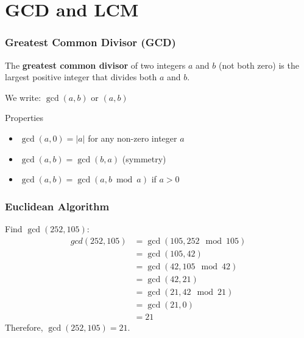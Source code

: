 \documentclass[10pt]{beamer}
\begin{document}
\section{GCD and LCM}

\begin{frame}
    \frametitle{Greatest Common Divisor (GCD)}
    \begin{definition}
        The \textbf{greatest common divisor} of two integers $a$ and $b$ (not both zero) is the largest positive integer that divides both $a$ and $b$.

        We write: $\gcd(a,b)$ or $(a,b)$
    \end{definition}

    \vspace{0.5cm}

    \begin{block}{Properties}
        \begin{itemize}
            \item $\gcd(a,0) = |a|$ for any non-zero integer $a$
            \item $\gcd(a,b) = \gcd(b,a)$ (symmetry)
            \item $\gcd(a,b) = \gcd(a, b \bmod a)$ if $a > 0$
        \end{itemize}
    \end{block}
\end{frame}

\begin{frame}
    \frametitle{Euclidean Algorithm}

    \begin{example}
        Find $\gcd(252, 105)$:
        \begin{align}
            gcd(252, 105) & = \gcd(105, 252 \mod 105) \\
                          & = \gcd(105, 42)           \\
                          & = \gcd(42, 105 \mod 42)   \\
                          & = \gcd(42, 21)            \\
                          & = \gcd(21, 42 \mod 21)    \\
                          & = \gcd(21, 0)             \\
                          & = 21
        \end{align}
        Therefore, $\gcd(252,105) = 21$.
    \end{example}
\end{frame}
\end{document}
